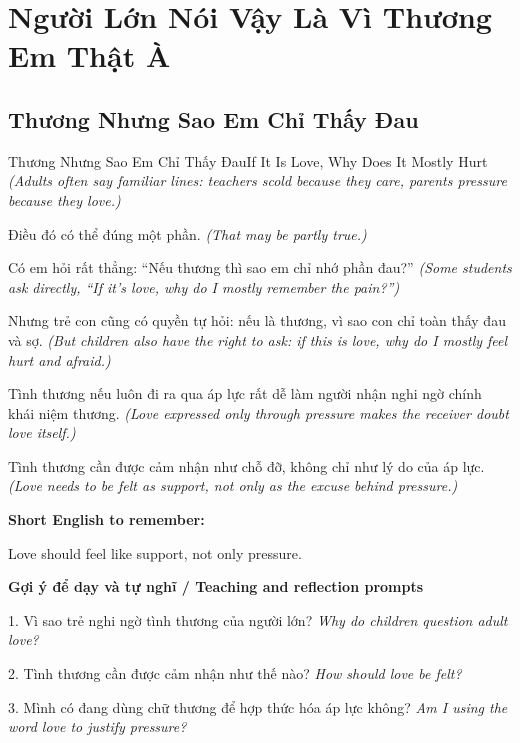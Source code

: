 \chapter{Người Lớn Nói Vậy Là Vì Thương Em Thật À}

\section{Thương Nhưng Sao Em Chỉ Thấy Đau}
\begin{truyen}{Thương Nhưng Sao Em Chỉ Thấy Đau}{If It Is Love, Why Does It Mostly Hurt}
\textit{(Adults often say familiar lines: teachers scold because they care, parents pressure because they love.)}

Điều đó có thể đúng một phần.
\textit{(That may be partly true.)}

Có em hỏi rất thẳng: “Nếu thương thì sao em chỉ nhớ phần đau?”
\textit{(Some students ask directly, “If it's love, why do I mostly remember the pain?”)}

Nhưng trẻ con cũng có quyền tự hỏi: nếu là thương, vì sao con chỉ toàn thấy đau và sợ.
\textit{(But children also have the right to ask: if this is love, why do I mostly feel hurt and afraid.)}

Tình thương nếu luôn đi ra qua áp lực rất dễ làm người nhận nghi ngờ chính khái niệm thương.
\textit{(Love expressed only through pressure makes the receiver doubt love itself.)}

\end{truyen}

\begin{baihoc}
Tình thương cần được cảm nhận như chỗ đỡ, không chỉ như lý do của áp lực.
\textit{(Love needs to be felt as support, not only as the excuse behind pressure.)}
\end{baihoc}

\begin{ghinhoanh}
\textbf{Short English to remember:}

Love should feel like support, not only pressure.

\end{ghinhoanh}

\begin{tuhocnhanh}
\textbf{Gợi ý để dạy và tự nghĩ / Teaching and reflection prompts}

1. Vì sao trẻ nghi ngờ tình thương của người lớn? \textit{Why do children question adult love?}

2. Tình thương cần được cảm nhận như thế nào? \textit{How should love be felt?}

3. Mình có đang dùng chữ thương để hợp thức hóa áp lực không? \textit{Am I using the word love to justify pressure?}
\end{tuhocnhanh}
\ngancach

